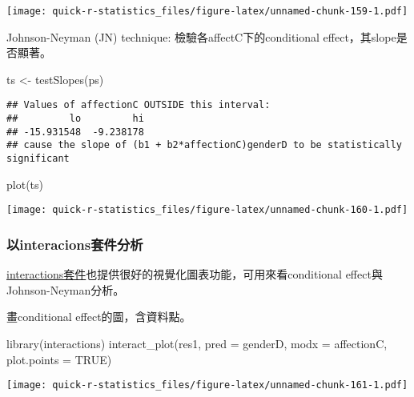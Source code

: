 \documentclass[
]{book}
\newenvironment{Shaded}{\begin{snugshade}}{\end{snugshade}}
\newcommand{\AttributeTok}[1]{\textcolor[rgb]{0.77,0.63,0.00}{#1}}
\newcommand{\ConstantTok}[1]{\textcolor[rgb]{0.00,0.00,0.00}{#1}}
\newcommand{\FunctionTok}[1]{\textcolor[rgb]{0.00,0.00,0.00}{#1}}
\newcommand{\NormalTok}[1]{#1}
\newcommand{\OtherTok}[1]{\textcolor[rgb]{0.56,0.35,0.01}{#1}}
\begin{document}
\texttt{[image: quick-r-statistics\_files/figure-latex/unnamed-chunk-159-1.pdf]}

Johnson-Neyman (JN) technique: 檢驗各affectC下的conditional effect，其slope是否顯著。

\begin{Shaded}
\begin{Highlighting}[]
\NormalTok{ts }\OtherTok{\textless{}{-}} \FunctionTok{testSlopes}\NormalTok{(ps)}
\end{Highlighting}
\end{Shaded}

\begin{verbatim}
## Values of affectionC OUTSIDE this interval:
##         lo         hi 
## -15.931548  -9.238178 
## cause the slope of (b1 + b2*affectionC)genderD to be statistically significant
\end{verbatim}

\begin{Shaded}
\begin{Highlighting}[]
\FunctionTok{plot}\NormalTok{(ts)}
\end{Highlighting}
\end{Shaded}

\texttt{[image: quick-r-statistics\_files/figure-latex/unnamed-chunk-160-1.pdf]}

\hypertarget{ux4ee5interacionsux5957ux4ef6ux5206ux6790}{%
\subsubsection{以interacions套件分析}\label{ux4ee5interacionsux5957ux4ef6ux5206ux6790}}

\href{https://cran.r-project.org/web/packages/interactions/readme/README.html}{interactions套件}也提供很好的視覺化圖表功能，可用來看conditional effect與Johnson-Neyman分析。

畫conditional effect的圖，含資料點。

\begin{Shaded}
\begin{Highlighting}[]
\FunctionTok{library}\NormalTok{(interactions)}
\FunctionTok{interact\_plot}\NormalTok{(res1, }\AttributeTok{pred =}\NormalTok{ genderD, }\AttributeTok{modx =}\NormalTok{ affectionC, }\AttributeTok{plot.points =} \ConstantTok{TRUE}\NormalTok{)}
\end{Highlighting}
\end{Shaded}

\texttt{[image: quick-r-statistics\_files/figure-latex/unnamed-chunk-161-1.pdf]}
\end{document}
